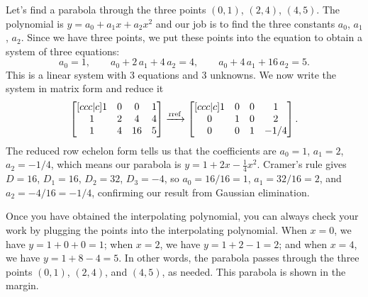 \begin{example}
Let's find a parabola through the three points $(0, 1)$, $(2, 4)$, $(4, 5)$.  The polynomial is $y=a_0 +a_1 x+a_2 x^2$ and our job is to find the three constants $a_0$,  $a_1$, $a_2$.  Since we have three points, we put these points into the equation to obtain a system of three equations:
$$
a_{{0}}=1, \quad \quad 
a_{{0}}+2\,a_{{1}}+4\,a_{{2}}=4, \quad \quad 
a_{{0}}+4\,a_{{1}}+16\,a_{{2}}=5.
$$
This is a linear system with 3 equations and 3 unknowns.  We now write the system in matrix form and reduce it
$$
\begin{bmatrix}[ccc|c] 
1&0&0&1\\
1&2&4&4\\
1&4&16&5
\end {bmatrix}
\xrightarrow{\operatorname{rref}}
\begin{bmatrix}[ccc|c]
1&0&0&1\\
0&1&0&2\\
0&0&1&-1/4
\end {bmatrix} 
.$$
The reduced row echelon form tells us that the coefficients are $a_0 = 1$, $a_1= 2$, $a_2=-1/4$, which means our parabola is $y=1+2 x- \frac 14 x^2$. Cramer's rule gives $D=16$, $D_1=16$, $D_2=32$, $D_3=-4$, so $a_0 = 16/16=1$, $a_1=32/16=2$, and $a_2=-4/16=-1/4$, confirming our result from Gaussian elimination.

%
%
Once you have obtained the interpolating polynomial, you can always check your work by plugging the points into the interpolating polynomial. When $x=0$, we have $y=1+0+0=1$; when $x=2$, we have $y=1+2-1=2$; and when $x=4$, we have $y=1+8-4=5$.  In other words,  the parabola passes through the three points $(0,1)$, $(2,4)$, and $(4,5)$, as needed.  This parabola is shown in the margin.  
\end{example}

